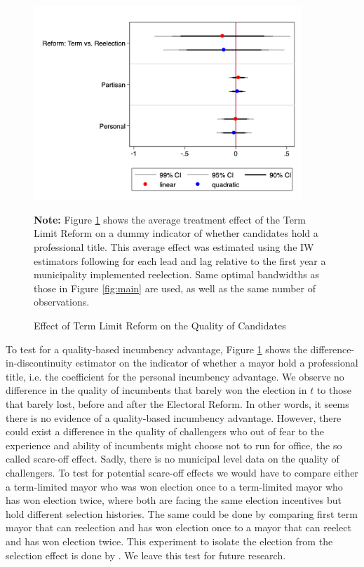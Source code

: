 \documentclass[12pt]{amsart}
\numberwithin{equation}{section}
\theoremstyle{definition}
\theoremstyle{definition}
\theoremstyle{definition}
\begin{document}
 \begin{figure}[H]   
\centering
 \caption{Effect of Term Limit Reform on the Quality of Candidates}
 \label{fig:quality_trend}
\includegraphics[width=0.9\textwidth]{Figures_incumbency/quality.png}
       \captionsetup{justification=centering}
         
 \textbf{Note:} Figure \ref{fig:quality_trend} shows the average treatment effect of the Term Limit Reform on a dummy indicator of whether candidates hold a professional title. This average effect was estimated using the IW estimators following \citet{abraham_sun_2020} for each lead and lag relative to the first year a municipality implemented reelection. Same optimal bandwidths as those in Figure \ref{fig:main} are used, as well as the same number of observations.   
     
\end{figure}   

To test for a quality-based incumbency advantage, Figure \ref{fig:quality_trend} shows the difference-in-discontinuity estimator on the indicator of whether a mayor hold a professional title, i.e. the coefficient for the personal incumbency advantage. We observe no difference in the quality of incumbents that barely won the election in $t$ to those that barely lost, before and after the Electoral Reform. In other words, it seems there is no evidence of a quality-based incumbency advantage. However, there could exist a difference in the quality of challengers who out of fear to the experience and ability of incumbents might choose not to run for office, the so called scare-off effect. Sadly, there is no municipal level data on the quality of challengers. To test for potential scare-off effects we would have to compare either a term-limited mayor who was won election once to a term-limited mayor who has won election twice, where both are facing the same election incentives but hold different selection histories. The same could be done by comparing first term mayor that can reelection and has won election once to a mayor that can reelect and has won election twice. This experiment to isolate the election from the selection effect is done by \citet{ashworth_2012}. We leave this test for future research.
\end{document}
